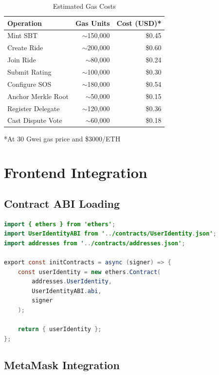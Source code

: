 \documentclass[12pt]{report}
\theoremstyle{plain}
\theoremstyle{definition}
\theoremstyle{remark}
\begin{document}
\begin{table}[H]
\centering
\caption{Estimated Gas Costs}
\begin{tabular}{|l|r|r|}
\hline
\textbf{Operation} & \textbf{Gas Units} & \textbf{Cost (USD)*} \\
\hline
Mint SBT & $\sim$150,000 & \$0.45 \\
Create Ride & $\sim$200,000 & \$0.60 \\
Join Ride & $\sim$80,000 & \$0.24 \\
Submit Rating & $\sim$100,000 & \$0.30 \\
Configure SOS & $\sim$180,000 & \$0.54 \\
Anchor Merkle Root & $\sim$50,000 & \$0.15 \\
Register Delegate & $\sim$120,000 & \$0.36 \\
Cast Dispute Vote & $\sim$60,000 & \$0.18 \\
\hline
\end{tabular}
\end{table}
*At 30 Gwei gas price and \$3000/ETH

\section{Frontend Integration}

\subsection{Contract ABI Loading}

\begin{lstlisting}[language=Java, caption=Contract Initialization]
import { ethers } from 'ethers';
import UserIdentityABI from '../contracts/UserIdentity.json';
import addresses from '../contracts/addresses.json';

export const initContracts = async (signer) => {
    const userIdentity = new ethers.Contract(
        addresses.UserIdentity,
        UserIdentityABI.abi,
        signer
    );
    
    return { userIdentity };
};
\end{lstlisting}

\subsection{MetaMask Integration}
\end{document}
